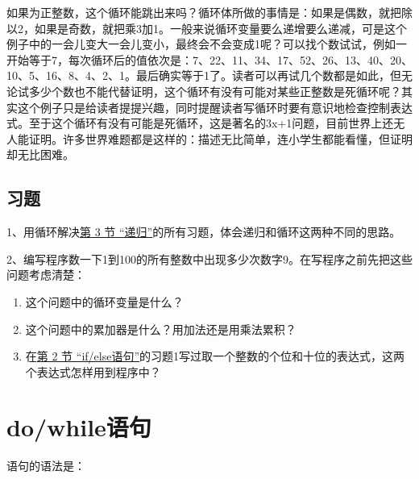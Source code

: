 

如果为正整数，这个循环能跳出来吗？循环体所做的事情是：如果是偶数，就把除以2，如果是奇数，就把乘3加1。一般来说循环变量要么递增要么递减，可是这个例子中的一会儿变大一会儿变小，最终会不会变成1呢？可以找个数试试，例如一开始等于7，每次循环后的值依次是：7、22、11、34、17、52、26、13、40、20、10、5、16、8、4、2、1。最后确实等于1了。读者可以再试几个数都是如此，但无论试多少个数也不能代替证明，这个循环有没有可能对某些正整数是死循环呢？其实这个例子只是给读者提提兴趣，同时提醒读者写循环时要有意识地检查控制表达式。至于这个循环有没有可能是死循环，这是著名的3x+\BookSplit{}1问题，目前世界上还无人能证明。许多世界难题都是这样的：描述无比简单，连小学生都能看懂，但证明却无比困难。


\subsection*{习题}
%


1、用循环解决\hyperlink{db.ch05s03.id2722951}{第 3 节 “递归”}的所有习题，体会递归和循环这两种不同的思路。



2、编写程序数一下1到100的所有整数中出现多少次数字9。在写程序之前先把这些问题考虑清楚：


\begin{enumerate}

\item 这个问题中的循环变量是什么？

\item 这个问题中的累加器是什么？用加法还是用乘法累积？

\item 在\hyperlink{db.ch04s02.id2718511}{第 2 节 “if/\BookSplit{}else语句”}的习题1写过取一个整数的个位和十位的表达式，这两个表达式怎样用到程序中？
\end{enumerate}




\section{do/while语句}
%
语句的语法是：


